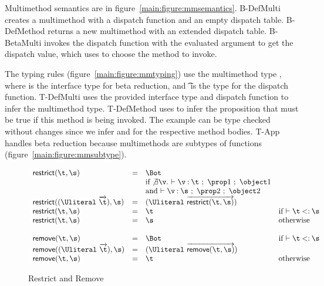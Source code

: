 Multimethod semantics are in figure~\ref{main:figure:mmsemantics}.
B-DefMulti creates a multimethod with a dispatch function and an empty dispatch table.
B-DefMethod returns a new multimethod with an extended dispatch table.
B-BetaMulti invokes the dispatch function with the evaluated argument to get the dispatch value,
which \getmethodliteral{} uses to choose the method to invoke.

The typing rules (figure~\ref{main:figure:mmtyping}) use the multimethod type {\MultiFntype{\s{}}{\t{}}}, 
where \s{} is the interface type for beta reduction, and \t{} is the type for
the dispatch function. T-DefMulti uses the provided interface type and dispatch function
to infer the multimethod type. T-DefMethod uses \isacompareliteral{} to infer the proposition
that must be true if this method is being invoked. The example can be type checked without
changes since we infer \isprop{\Number}{\x{}} and \isprop{\Keyword}{\x{}} for the respective
method bodies. T-App handles beta reduction because multimethods are subtypes of functions
(figure~\ref{main:figure:mmsubtype}).



{}

\begin{figure}
  $$
\begin{array}{lllll}
  \restrictremovefigure{}
\end{array}
  $$
  \caption{Restrict and Remove}
  \label{main:figure:restrictremove}
\end{figure}
